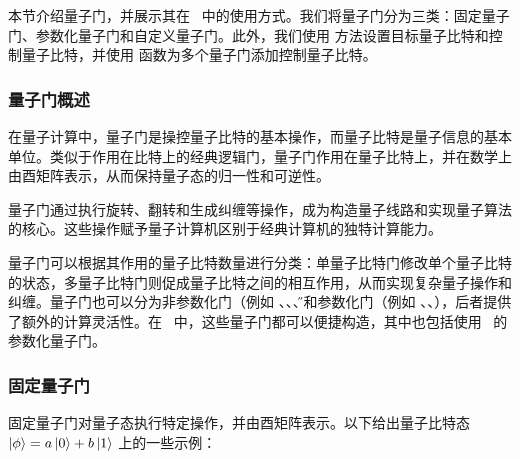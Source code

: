 本节介绍量子门，并展示其在 \MindQuantum\ 中的使用方式。我们将量子门分为三类：固定量子门、参数化量子门和自定义量子门。此外，我们使用  方法设置目标量子比特和控制量子比特，并使用  函数为多个量子门添加控制量子比特。

\subsubsection{量子门概述}

在量子计算中，量子门是操控量子比特的基本操作，而量子比特是量子信息的基本单位。类似于作用在比特上的经典逻辑门，量子门作用在量子比特上，并在数学上由酉矩阵表示，从而保持量子态的归一性和可逆性。

量子门通过执行旋转、翻转和生成纠缠等操作，成为构造量子线路和实现量子算法的核心。这些操作赋予量子计算机区别于经典计算机的独特计算能力。

量子门可以根据其作用的量子比特数量进行分类：单量子比特门修改单个量子比特的状态，多量子比特门则促成量子比特之间的相互作用，从而实现复杂量子操作和纠缠。量子门也可以分为非参数化门（例如 \X、\Y、\Z、\H）和参数化门（例如 \RX、\RY、\RZ），后者提供了额外的计算灵活性。在 \MindQuantum\ 中，这些量子门都可以便捷构造，其中也包括使用 \ParameterResolver\ 的参数化量子门。

\subsubsection{固定量子门}
固定量子门对量子态执行特定操作，并由酉矩阵表示。以下给出量子比特态 $\ket{\phi}=a\ket{0}+b\ket{1}$ 上的一些示例：

